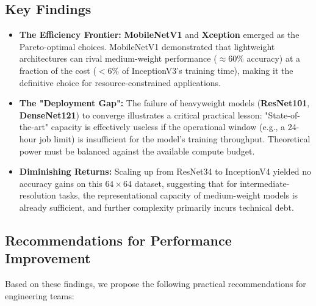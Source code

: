 \documentclass[acmsmall]{acmart}
\begin{document}
\subsection{Key Findings}
\begin{itemize}
    \item \textbf{The Efficiency Frontier:} \textbf{MobileNetV1} and \textbf{Xception} emerged as the Pareto-optimal choices. MobileNetV1 demonstrated that lightweight architectures can rival medium-weight performance ($\approx 60\%$ accuracy) at a fraction of the cost ($<6\%$ of InceptionV3's training time), making it the definitive choice for resource-constrained applications.
    \item \textbf{The "Deployment Gap":} The failure of heavyweight models (\textbf{ResNet101}, \textbf{DenseNet121}) to converge illustrates a critical practical lesson: "State-of-the-art" capacity is effectively useless if the operational window (e.g., a 24-hour job limit) is insufficient for the model's training throughput. Theoretical power must be balanced against the available compute budget.
    \item \textbf{Diminishing Returns:} Scaling up from ResNet34 to InceptionV4 yielded no accuracy gains on this $64 \times 64$ dataset, suggesting that for intermediate-resolution tasks, the representational capacity of medium-weight models is already sufficient, and further complexity primarily incurs technical debt.
\end{itemize}

\subsection{Recommendations for Performance Improvement}
Based on these findings, we propose the following practical recommendations for engineering teams:
\end{document}
